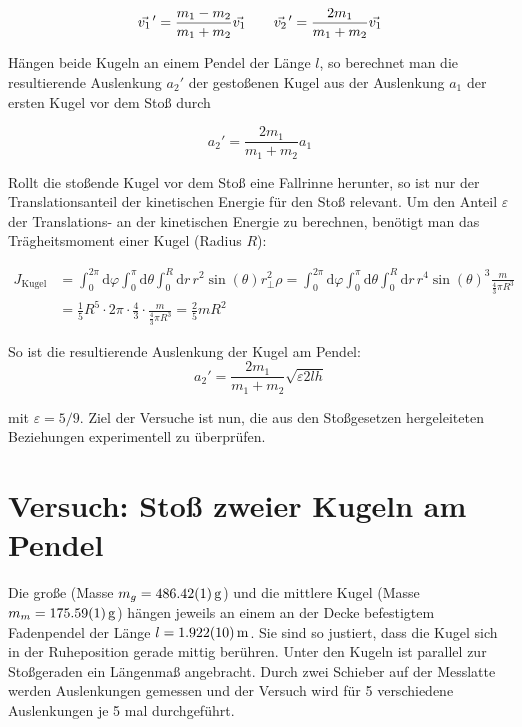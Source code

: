 \begin{equation}
  \pvec{v_1}'=\frac{m_1-m_2}{m_1+m_2}\vec{v_1} \qquad \pvec{v_2}'=\frac{2m_1}{m_1+m_2}\vec{v_1}
  \label{eq:stossgeschw}
\end{equation}

Hängen beide Kugeln an einem Pendel der Länge $l$, so berechnet man die resultierende Auslenkung $a_2'$ der gestoßenen Kugel aus der Auslenkung $a_1$ der ersten Kugel vor dem Stoß durch

\begin{equation}
  a_2'=\frac{2m_1}{m_1+m_2}a_1
  \label{eq:auslenkung}
\end{equation}

Rollt die stoßende Kugel vor dem Stoß eine Fallrinne herunter, so ist nur der Translationsanteil der kinetischen Energie für den Stoß relevant. Um den Anteil $\varepsilon$ der Translations- an der kinetischen Energie zu berechnen, benötigt man das Trägheitsmoment einer Kugel (Radius $R$):

\begin{align}
  J_{\text{Kugel}}&=\int_0^{2\pi}\mathrm{d}\varphi\int_0^\pi\mathrm{d}\theta\int_0^R \mathrm{d}r \, r^2 \sin(\theta)r_\bot^2 \rho
  =\int_0^{2\pi}\mathrm{d}\varphi\int_0^\pi\mathrm{d}\theta\int_0^R \mathrm{d}r \, r^4\sin(\theta)^3 \frac{m}{\frac{4}{3}\pi R^3} \\
  &=\frac{1}{5}R^5 \cdot 2\pi\cdot \frac{4}{3}\cdot \frac{m}{\frac{4}{3}\pi R^3} = \frac{2}{5}mR^2
  \label{eq:traegheitsmom}
\end{align}

So ist die resultierende Auslenkung der Kugel am Pendel:
\begin{equation}
  a_2'=\frac{2m_1}{m_1+m_2}\sqrt{\varepsilon 2lh}
  \label{eq:fallrinne}
\end{equation}

mit $\varepsilon=5/9$.
Ziel der Versuche ist nun, die aus den Stoßgesetzen hergeleiteten Beziehungen experimentell zu überprüfen.

\section{Versuch: Stoß zweier Kugeln am Pendel}

Die große (Masse $m_g=\SI{486.42\pm0.01}{g}$) und die mittlere Kugel (Masse $m_m=\SI{175.59\pm0.01}{g}$) hängen jeweils an einem an der Decke befestigtem Fadenpendel der Länge $l=\SI{1.922\pm0.01}{m}$. Sie sind so justiert, dass die Kugel sich in der Ruheposition gerade mittig berühren. Unter den Kugeln ist parallel zur Stoßgeraden ein Längenmaß angebracht. Durch zwei Schieber auf der Messlatte werden Auslenkungen gemessen und der Versuch wird für 5 verschiedene Auslenkungen je 5 mal durchgeführt.\\

